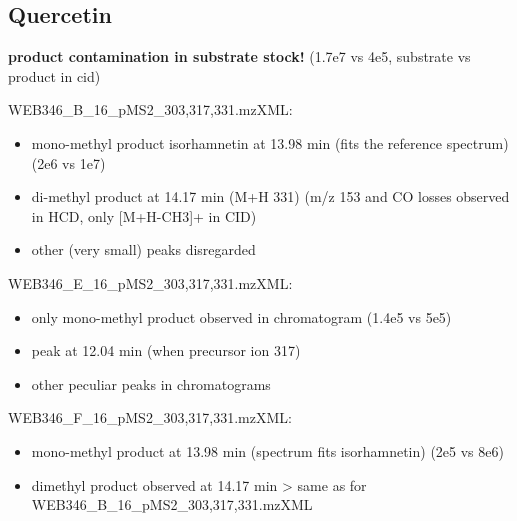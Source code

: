 \documentclass[]{article}
\begin{document}
\subsection{Quercetin}\label{quercetin}

\textbf{product contamination in substrate stock!} (1.7e7 vs 4e5,
substrate vs product in cid)

WEB346\_B\_16\_pMS2\_303,317,331.mzXML:

\begin{itemize}
\itemsep1pt\parskip0pt
\item
  mono-methyl product isorhamnetin at 13.98 min (fits the reference
  spectrum) (2e6 vs 1e7)
\item
  di-methyl product at 14.17 min (M+H 331) (m/z 153 and CO losses
  observed in HCD, only {[}M+H-CH3{]}+ in CID)
\item
  other (very small) peaks disregarded
\end{itemize}

WEB346\_E\_16\_pMS2\_303,317,331.mzXML:

\begin{itemize}
\itemsep1pt\parskip0pt
\item
  only mono-methyl product observed in chromatogram (1.4e5 vs 5e5)
\item
  peak at 12.04 min (when precursor ion 317)
\item
  other peculiar peaks in chromatograms
\end{itemize}

WEB346\_F\_16\_pMS2\_303,317,331.mzXML:

\begin{itemize}
\itemsep1pt\parskip0pt
\item
  mono-methyl product at 13.98 min (spectrum fits isorhamnetin) (2e5 vs
  8e6)
\item
  dimethyl product observed at 14.17 min \textgreater{} same as for
  WEB346\_B\_16\_pMS2\_303,317,331.mzXML
\end{itemize}
\end{document}
